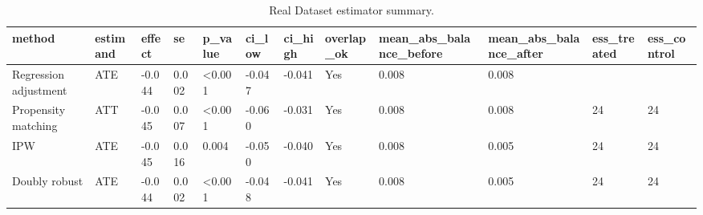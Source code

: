 \begin{table}
\caption{Real Dataset estimator summary.}
\label{tab:real_dataset-estimators}
\begin{tabular}{llllllllllll}
\toprule
method & estimand & effect & se & p_value & ci_low & ci_high & overlap_ok & mean_abs_balance_before & mean_abs_balance_after & ess_treated & ess_control \\
\midrule
Regression adjustment & ATE & -0.044 & 0.002 & <0.001 & -0.047 & -0.041 & Yes & 0.008 & 0.008 &  &  \\
Propensity matching & ATT & -0.045 & 0.007 & <0.001 & -0.060 & -0.031 & Yes & 0.008 & 0.008 & 24 & 24 \\
IPW & ATE & -0.045 & 0.016 & 0.004 & -0.050 & -0.040 & Yes & 0.008 & 0.005 & 24 & 24 \\
Doubly robust & ATE & -0.044 & 0.002 & <0.001 & -0.048 & -0.041 & Yes & 0.008 & 0.005 & 24 & 24 \\
\bottomrule
\end{tabular}
\end{table}
